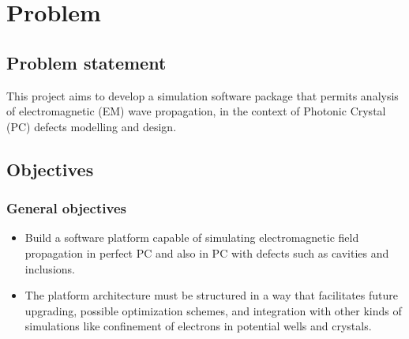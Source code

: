 \chapter{Problem}
\label{ch:Problem}

\section{Problem statement}

This project aims to develop a simulation software package that permits analysis of electromagnetic (EM) wave propagation, in the context of Photonic Crystal (PC) defects modelling and design.

\section{Objectives }

\subsection{General objectives}
\begin{itemize}
\item Build a software platform capable of simulating   electromagnetic field propagation in perfect PC and also in PC with defects such as cavities and inclusions.
\item The platform architecture must be structured in a way that facilitates future upgrading, possible optimization schemes, and integration with other kinds of simulations like confinement of electrons in potential wells and crystals. 
\end{itemize}



